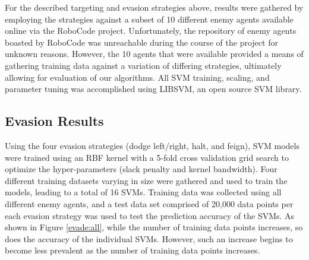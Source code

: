 \documentclass{article}
\theoremstyle{plain}
\theoremstyle{definition}
\theoremstyle{remark}
\begin{document}
For the described targeting and evasion strategies above, results were gathered by employing the strategies against a subset of 10 different enemy agents available online via the RoboCode project. Unfortunately, the repository of enemy agents boasted by RoboCode was unreachable during the course of the project for unknown reasons. However, the 10 agents that were available provided a means of gathering training data against a variation of differing strategies, ultimately allowing for evaluation of our algorithms. All SVM training, scaling, and parameter tuning was accomplished using LIBSVM, an open source SVM library\cite{libsvm}.

\subsection*{Evasion Results}
Using the four evasion strategies (dodge left/right, halt, and feign), SVM models were trained using an RBF kernel with a 5-fold cross validation grid search to optimize the hyper-parameters (slack penalty and kernel bandwidth). Four different training datasets varying in size were gathered and used to train the models, leading to a total of 16 SVMs. Training data was collected using all different enemy agents, and a test data set comprised of 20,000 data points per each evasion strategy was used to test the prediction accuracy of the SVMs. As shown in Figure \ref{evade:all}, while the number of training data points increases, so does the accuracy of the individual SVMs. However, such an increase begins to become less prevalent as the number of training data points increases.
\end{document}

